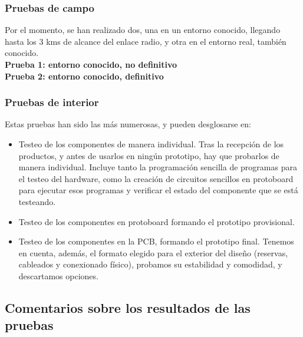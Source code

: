 \documentclass[12pt]{article}
\begin{document}
	\subsubsection{Pruebas de campo}
	
	\noindent Por el momento, se han realizado dos, una en un entorno conocido, llegando hasta los 3 kms de alcance del enlace radio, y otra en el entorno real, también conocido. \\
	
	\noindent \textbf{Prueba 1: entorno conocido, no definitivo} \\
	
	\noindent \textbf{Prueba 2: entorno conocido, definitivo} \\

	\subsubsection{Pruebas de interior}
	
	\noindent Estas pruebas han sido las más numerosas, y pueden desglosarse en: \\
	
	\begin{itemize}
		\item Testeo de los componentes de manera individual. Tras la recepción de los productos, y antes de usarlos en ningún prototipo, hay que probarlos de manera individual. Incluye tanto la programación sencilla de programas para el testeo del hardware, como la creación de circuitos sencillos en protoboard para ejecutar esos programas y verificar el estado del componente que se está testeando.
		\item Testeo de los componentes en protoboard formando el prototipo provisional.
		\item Testeo de los componentes en la PCB, formando el prototipo final. Tenemos en cuenta, además, el formato elegido para el exterior del diseño (reservas, cableados y conexionado físico), probamos su estabilidad y comodidad, y descartamos opciones.
	\end{itemize}
	
	\pagebreak
	
	\subsection[Comentarios sobre los resultados de las pruebas]{Comentarios sobre los resultados de las pruebas}
	
	\noindent 
	
\end{document}
